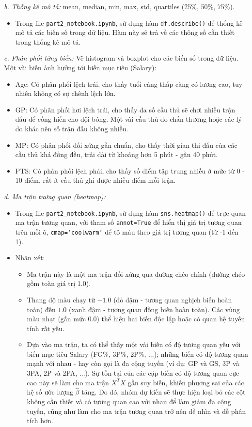 \textit{b. Thống kê mô tả:} mean, median, min, max, std, quartiles (25\%, 50\%, 75\%).
\begin{itemize}
    \item Trong file \texttt{part2\_notebook.ipynb}, sử dụng hàm \texttt{df.describe()} để thống kê mô tả các biến số trong dữ liệu. Hàm này sẽ trả về các thông số cần thiết trong thống kê mô tả.
\end{itemize}

\textit{c. Phân phối từng biến:} Vẽ histogram và boxplot cho các biến số trong dữ liệu. Một vài biến ảnh hưởng tới biến mục tiêu (Salary):
\begin{itemize}
    \item Age: Có phân phối lệch trái, cho thấy tuổi càng thấp càng có lương cao, tuy nhiên không có sự chênh lệch lớn.
    \item GP: Có phân phối hơi lệch trái, cho thấy đa số cầu thủ sẽ chơi nhiều trận đấu để cống hiến cho đội bóng. Một vài cầu thủ do chấn thương hoặc các lý do khác nên số trận đấu không nhiều.
    \item MP: Có phân phối đối xứng gần chuẩn, cho thấy thời gian thi đấu của các cầu thủ khá đồng đều, trải dài từ khoảng hơn 5 phút - gần 40 phút.
    \item PTS: Có phân phối lệch phải, cho thấy số điểm tập trung nhiều ở mức từ 0 - 10 điểm, rất ít cầu thủ ghi được nhiều điểm mỗi trận.
\end{itemize}

\textit{d. Ma trận tương quan (heatmap):}
\begin{itemize}
    \item Trong file \texttt{part2\_notebook.ipynb}, sử dụng hàm \texttt{sns.heatmap()} để trực quan ma trận tương quan, với tham số \texttt{annot=True} để hiển thị giá trị tương quan trên mỗi ô, \texttt{cmap='coolwarm'} để tô màu theo giá trị tương quan (từ -1 đến 1).
    \item Nhận xét:
    \begin{itemize}
        \item Ma trận này là một ma trận đối xứng qua đường chéo chính (đường chéo gồm toàn giá trị 1.0).
        \item Thang độ màu chạy từ $-1.0$ (đỏ đậm - tương quan nghịch biến hoàn toàn) đến $1.0$ (xanh đậm - tương quan đồng biến hoàn toàn). Các vùng màu nhạt (gần mức $0.0$) thể hiện hai biến độc lập hoặc có quan hệ tuyến tính rất yếu.
        \item Dựa vào ma trận, ta có thể thấy một vài biến có độ tương quan yếu với biến mục tiêu Salary (FG\%, 3P\%, 2P\%, ...); những biến có độ tương quan mạnh với nhau - hay còn gọi là đa cộng tuyến (ví dụ: GP và GS, 3P và 3PA, 2P và 2PA, ...). Sự tồn tại của các cặp biến có độ tương quan cực cao này sẽ làm cho ma trận $X^T X$ gần suy biến, khiến phương sai của các hệ số ước lượng $\hat{\beta}$ tăng. Do đó, nhóm dự kiến sẽ thực hiện loại bỏ các cột không cần thiết và có tương quan cao với nhau để làm giảm đa cộng tuyến, cũng như làm cho ma trận tương quan trở nên dễ nhìn và dễ phân tích hơn.
    \end{itemize}
\end{itemize}

